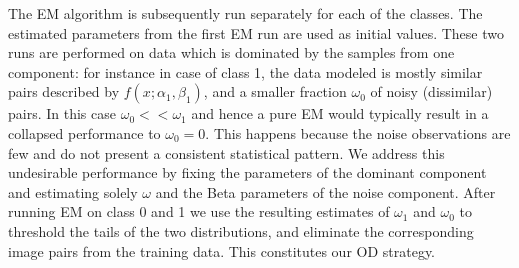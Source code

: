 \documentclass[lettersize,journal]{IEEEtran}
\begin{document}
The EM algorithm is subsequently run separately for each of the classes. The estimated parameters from the first EM run are used as initial values. 
These two runs are performed on data which is dominated by the samples from one component: for instance in case of class 1, the data modeled is mostly similar pairs described by $f(x; \alpha_1,\beta_1)$, and a smaller fraction $\omega_0$ of noisy (dissimilar) pairs. In this case $\omega_0<<\omega_1$ and hence a pure EM would typically result in a collapsed performance to $\omega_0=0$. This happens because the noise observations are few and do not present a consistent statistical pattern. We address this undesirable performance by fixing the parameters of the dominant component and estimating solely $\omega$ and the Beta parameters of the noise component.
After running EM on class 0 and 1 we use the resulting estimates of $\omega_1$ and $\omega_0$ to threshold the tails of the two distributions, and eliminate the corresponding image pairs from the training data. This constitutes our OD strategy.
\end{document}
